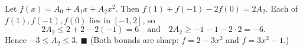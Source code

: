 Let $f(x)=A_0+A_1x+A_2x^2$. Then $f(1)+f(-1)-2f(0)=2A_2$. Each of $f(1),f(-1),f(0)$ lies in $[-1,2]$, so
\[2A_2\le2+2-2(-1)=6\quad\text{and}\quad2A_2\ge-1-1-2\cdot2=-6.\]
Hence $-3\le A_2\le3$. $\blacksquare$ (Both bounds are sharp: $f=2-3x^2$ and $f=3x^2-1$.)
